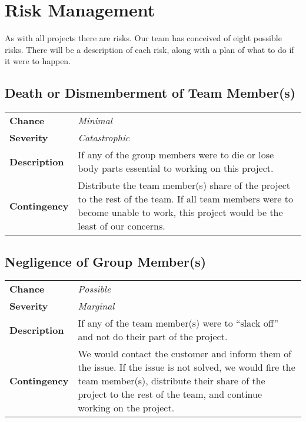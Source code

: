 \documentclass[12pt]{article}
\begin{document}

\section{Risk Management}
As with all projects there are risks. Our team has conceived of eight possible
risks. There will be a description of each risk, along with a plan of what to
do if it were to happen.

\subsection*{Death or Dismemberment of Team Member(s)}
\begin{tabular}{ l p{10cm} }
	\textbf{Chance} & \textit{Minimal} \\
	\textbf{Severity} & \textit{Catastrophic} \\
	\textbf{Description} & If any of the group members were to die or lose body
		parts essential to working on this project. \\
	\textbf{Contingency} & Distribute the team member(s) share of the project
		to the rest of the team. If all team members were to become unable to
		work, this project would be the least of our concerns. \\
\end{tabular}

\subsection*{Negligence of Group Member(s)}
\begin{tabular}{ l p{10cm} }
	\textbf{Chance} & \textit{Possible} \\
	\textbf{Severity} & \textit{Marginal} \\
	\textbf{Description} & If any of the team member(s) were to ``slack off''
		and not do their part of the project. \\
	\textbf{Contingency} & We would contact the customer and inform them of the
		issue. If the issue is not solved, we would fire the team member(s),
		distribute their share of the project to the rest of the team, and
		continue working on the project. \\
\end{tabular}
\end{document}
